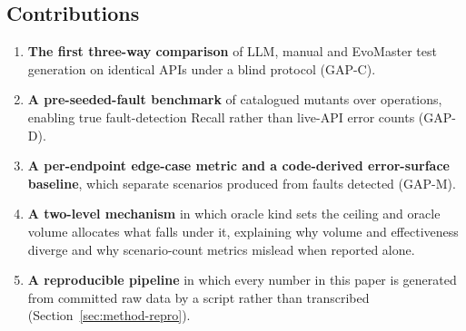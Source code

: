 \subsection{Contributions}
\begin{enumerate}
  \item \textbf{The first three-way comparison} of LLM, manual and EvoMaster test generation
        on identical APIs under a blind protocol (GAP-C).
  \item \textbf{A pre-seeded-fault benchmark} of \RQIIn{} catalogued mutants over
        \RQIopsTotal{} operations, enabling true fault-detection Recall rather than live-API
        error counts (GAP-D).
  \item \textbf{A per-endpoint edge-case metric and a code-derived error-surface baseline},
        which separate scenarios produced from faults detected (GAP-M).
  \item \textbf{A two-level mechanism} in which oracle kind sets the ceiling and oracle volume
        allocates what falls under it, explaining why volume and effectiveness diverge and why
        scenario-count metrics mislead when reported alone.
  \item \textbf{A reproducible pipeline} in which every number in this paper is generated from
        committed raw data by a script rather than transcribed
        (Section~\ref{sec:method-repro}).
\end{enumerate}
